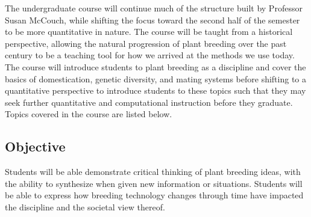 \documentclass[10pt]{article}
\begin{document}
The undergraduate course will continue much of the structure built by Professor Susan McCouch, while shifting the focus toward the second half of the semester to be more quantitative in nature. The course will be taught from a historical perspective, allowing the natural progression of plant breeding over the past century to be a teaching tool for how we arrived at the methods we use today. The course will introduce students to plant breeding as a discipline and cover the basics of domestication, genetic diversity, and mating systems before shifting to a quantitative perspective to introduce students to these topics such that they may seek further quantitative and computational instruction before they graduate. Topics covered in the course are listed below.

\subsection*{Objective}

Students will be able demonstrate critical thinking of plant breeding ideas, with the ability to synthesize when given new information or situations. Students will be able to express how breeding technology changes through time have impacted the discipline and the societal view thereof. 

\end{document}
